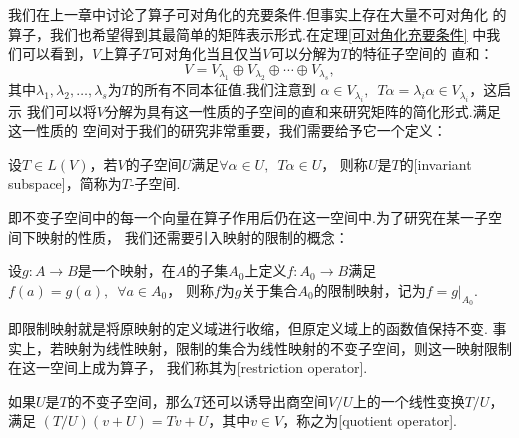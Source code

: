 我们在上一章中讨论了算子可对角化的充要条件.但事实上存在大量不可对角化
的算子，我们也希望得到其最简单的矩阵表示形式.在定理\ref{可对角化充要条件} %
中我们可以看到，$V$上算子$T$可对角化当且仅当$V$可以分解为$T$的特征子空间的
直和：\[V=V_{\lambda_1}\oplus V_{\lambda_2}\oplus\cdots\oplus V_{\lambda_s},\]
其中$\lambda_1,\lambda_2,\ldots,\lambda_s$为$T$的所有不同本征值.我们注意到
$\alpha\in V_{\lambda_i},\enspace T\alpha=\lambda_i\alpha\in V_{\lambda_i}$，这启示
我们可以将$V$分解为具有这一性质的子空间的直和来研究矩阵的简化形式.满足这一性质的
空间对于我们的研究非常重要，我们需要给予它一个定义：
\begin{definition}
    设$T\in L(V)$，若$V$的子空间$U$满足$\forall \alpha\in U,\enspace T\alpha\in U$，
    则称$U$是$T$的[invariant subspace]，简称为$T$-子空间.
\end{definition}
即不变子空间中的每一个向量在算子作用后仍在这一空间中.为了研究在某一子空间下映射的性质，
我们还需要引入映射的限制的概念：
\begin{definition}
    设$g:A\to B$是一个映射，在$A$的子集$A_0$上定义$f:A_0\to B$满足$f(a)=g(a),\enspace\forall a\in A_0$，
    则称$f$为$g$关于集合$A_0$的限制映射，记为$f=g\vert_{A_0}$.
\end{definition}
即限制映射就是将原映射的定义域进行收缩，但原定义域上的函数值保持不变.
事实上，若映射为线性映射，限制的集合为线性映射的不变子空间，则这一映射限制在这一空间上成为算子，
我们称其为[restriction operator].

如果$U$是$T$的不变子空间，那么$T$还可以诱导出商空间$V/U$上的一个线性变换$T/U$，满足
$(T/U)(v+U)=Tv+U$，其中$v\in V$，称之为[quotient operator].

